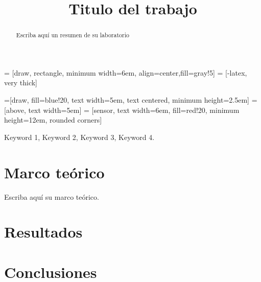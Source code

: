 \documentclass[conference,compsoc,onecolumn]{IEEEtran}
\begin{document}
 = [draw, rectangle, minimum width=6em, align=center,fill=gray!5]
 = [-latex, very thick]

\newcommand*{\tran}{\top}


=[draw, fill=blue!20, text width=5em, 
text centered, minimum height=2.5em]
 = [above, text width=5em]
 = [sensor, text width=6em, fill=red!20, minimum height=12em, rounded corners]
\def\blockdist{2.3}
\def\edgedist{2.5}

\title{Titulo del trabajo}

\author{
}

\maketitle

\IEEEoverridecommandlockouts


\IEEEpeerreviewmaketitle

\begin{abstract}
Escriba aquí un resumen de su laboratorio
\end{abstract}


\begin{IEEEkeywords}
    Keyword 1, Keyword 2, Keyword 3, Keyword 4.
\end{IEEEkeywords}


\section{Marco teórico}
\label{sec:introduction}
Escriba aquí su marco teórico.

\section{Resultados}
\label{sec:results}






\section{Conclusiones}
\label{sec:conclusions}



\nocite{*}

% 
%
%





\end{document}
